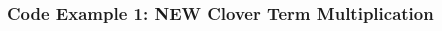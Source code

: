 \documentclass{beamer}
\begin{document}
  \begin{frame}[fragile]
    \frametitle{Code Example 1: NEW Clover Term Multiplication}
    \tiny

    \begin{columns}[T]
      \begin{column}{.5\textwidth}
      \end{column}
      \begin{column}{.5\textwidth}
      \end{column}
    \end{columns}

\end{frame}

\end{document}
